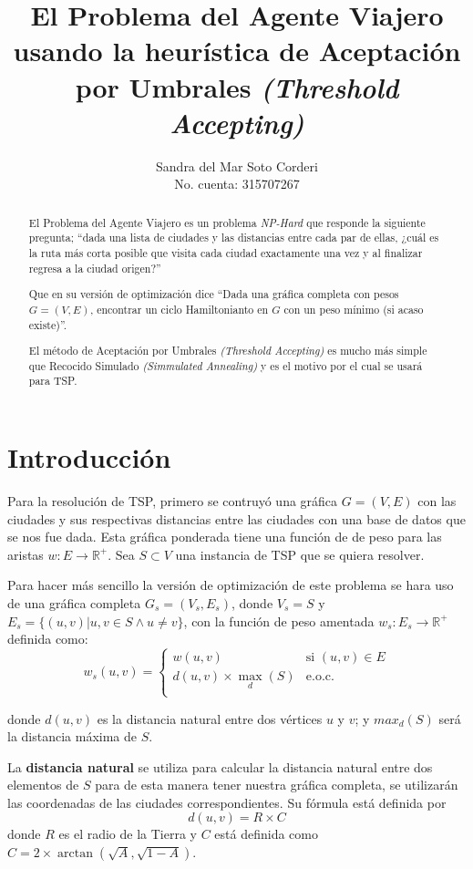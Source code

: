 \documentclass{article}
\title{El Problema del Agente Viajero usando la heurística de Aceptación por
Umbrales \emph{(Threshold Accepting)}}
\author{
  Sandra del Mar Soto Corderi\\
  No. cuenta: 315707267\\
}
\begin{document}
\maketitle

\begin{abstract}
El Problema del Agente Viajero es un problema \emph{NP-Hard} que responde la siguiente pregunta;
``dada una lista de ciudades y las distancias entre cada par de ellas, ¿cuál es la ruta más corta
posible que visita cada ciudad exactamente una vez y al finalizar regresa a la ciudad origen?''

Que en su versión de optimización dice ``Dada una gráfica completa con pesos $G=(V,E)$, encontrar un ciclo
Hamiltonianto en $G$ con un peso mínimo (si acaso existe)''.

El método de Aceptación por Umbrales \emph{(Threshold Accepting)} es mucho más simple que Recocido
Simulado \emph{(Simmulated Annealing)} y es el motivo por el cual se usará para TSP.
\end{abstract}


\section{Introducción}
Para la resolución de TSP, primero se contruyó una gráfica $G=(V,E)$ con las ciudades y sus respectivas
distancias entre las ciudades con una base de datos que se nos fue dada. Esta gráfica ponderada
tiene una función de de peso para las aristas $w: E \to \mathds{R}^+$. Sea $S \subset V$ una
instancia de TSP que se quiera resolver.

Para hacer más sencillo la versión de optimización de este problema se hara uso de una
gráfica completa $G_s =(V_s, E_s)$, donde $V_s = S$ y $E_s= \{ (u,v) | u,v \in S \land u \not= v \}$,
con la función de peso amentada $w_s : E_s \to \mathds{R}^+$ definida como:
\[
  w_s(u,v) =
    \begin{cases}
      w(u,v)                   & \text{si }(u,v) \in E\\
      d(u,v) \times \max_d (S) &\text{e.o.c.}\\
    \end{cases}
\]

donde $d(u,v)$ es la distancia natural entre dos vértices $u$ y $v$; y $max_d (S)$ será la
distancia máxima de $S$.

La \textbf{distancia natural} se utiliza para calcular la distancia natural entre dos elementos
de $S$ para de esta manera tener nuestra gráfica completa, se utilizarán las coordenadas de las
ciudades correspondientes. Su fórmula está definida por
\[
    d(u,v) = R \times C
\]
donde $R$ es el radio de la Tierra y $C$ está definida como $C = 2 \times \arctan(\sqrt{A},\sqrt{1-A})$.
\end{document}
